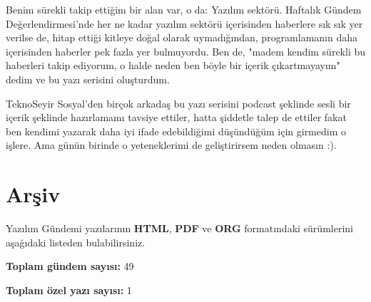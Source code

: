 \documentclass[11pt]{article}
\begin{document}
Benim sürekli takip ettiğim bir alan var, o da: Yazılım sektörü. Haftalık
Gündem Değerlendirmesi'nde her ne kadar yazılım sektörü içerisinden haberlere
sık sık yer verilse de, hitap ettiği kitleye doğal olarak uymadığından,
programlamanın daha içerisinden haberler pek fazla yer bulmuyordu. Ben de,
"madem kendim sürekli bu haberleri takip ediyorum, o halde neden ben böyle bir
içerik çıkartmayayım" dedim ve bu yazı serisini oluşturdum.

TeknoSeyir Sosyal'den birçok arkadaş bu yazı serisini podcast şeklinde sesli
bir içerik şeklinde hazırlamamı tavsiye ettiler, hatta şiddetle talep de
ettiler fakat ben kendimi yazarak daha iyi ifade edebildiğimi düşündüğüm için
girmedim o işlere. Ama günün birinde o yeteneklerimi de geliştirirsem neden
olmasın :).
\section*{Arşiv}
\label{sec:org80a82d9}
Yazılım Gündemi yazılarının \textbf{HTML}, \textbf{PDF} ve \textbf{ORG} formatındaki sürümlerini
aşağıdaki listeden bulabilirsiniz.

\textbf{Toplam gündem sayısı:} 49

\textbf{Toplam özel yazı sayısı:} 1
\end{document}
